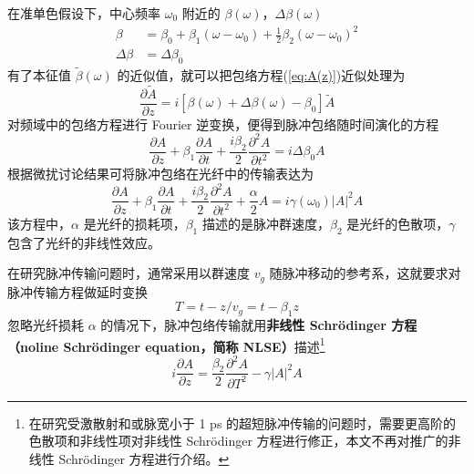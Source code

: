 在准单色假设下，中心频率 $\omega_0$ 附近的 $\beta(\omega)$，$\Delta\beta(\omega)$
\begin{subequations}
    \begin{align}
        \beta&=\beta_0+\beta_1(\omega-\omega_0)+\frac{1}{2}\beta_2(\omega-\omega_0)^2\\
        \Delta\beta&=\Delta\beta_0
    \end{align}
\end{subequations}
有了本征值 $\widetilde{\beta}(\omega)$ 的近似值，就可以把包络方程(\ref{eq:A(z)})近似处理为\cite{Agrawal}
\begin{equation}
    \frac{\partial \widetilde{A}}{\partial z}=i[\beta(\omega)+\Delta \beta(\omega)-\beta_0]\widetilde{A}    
\end{equation}
对频域中的包络方程进行 Fourier 逆变换，便得到脉冲包络随时间演化的方程
\begin{equation}
    \frac{\partial A}{\partial z}+\beta_1\frac{\partial A}{\partial t}+\frac{i\beta_2}{2}\frac{\partial^2 A}{\partial t^2}=i\Delta\beta_0A
\end{equation}
根据微扰讨论结果可将脉冲包络在光纤中的传输表达为
\begin{equation}
    \frac{\partial A}{\partial z}+\beta_1\frac{\partial A}{\partial t}+\frac{i\beta_2}{2}\frac{\partial^2 A}{\partial t^2}+\frac{\alpha}{2}A=i\gamma(\omega_0)|A|^2A
\end{equation}
该方程中，$\alpha$ 是光纤的损耗项，$\beta_1$ 描述的是脉冲群速度，$\beta_2$ 是光纤的色散项，$\gamma$ 包含了光纤的非线性效应。

在研究脉冲传输问题时，通常采用以群速度 $v_g$ 随脉冲移动的参考系，这就要求对脉冲传输方程做延时变换\cite{Agrawal}
\begin{equation}
    T=t-z/v_g=t-\beta_1z
\end{equation}
忽略光纤损耗 $\alpha$ 的情况下，脉冲包络传输就用{\bfseries 非线性 Schr\"odinger 方程（noline Schr\"odinger equation，简称 NLSE）}描述\footnote{在研究受激散射和或脉宽小于 1 ps 的超短脉冲传输的问题时，需要更高阶的色散项和非线性项对非线性 Schr\"odinger 方程进行修正，本文不再对推广的非线性 Schr\"odinger 方程进行介绍。}
\begin{equation}
    i\frac{\partial A}{\partial z}=\frac{\beta_2}{2}\frac{\partial^2A}{\partial T^2}-\gamma|A|^2A
    \label{eq:Schrodinger}
\end{equation}